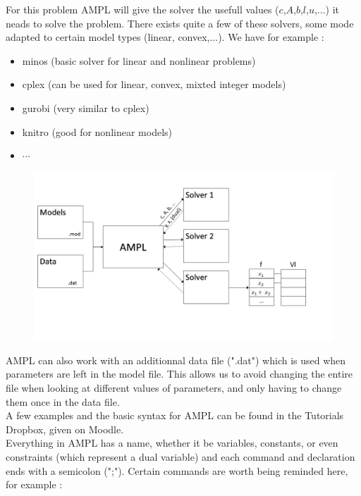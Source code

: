 \documentclass[a4paper,11pt]{article}
\begin{document}
For this problem AMPL will give the solver the usefull values ($c$,$A$,$b$,$l$,$u$,...) it neads to solve the problem. There exists quite a few of these solvers, some mode adapted to certain model types (linear, convex,...). 
We have for example :  \\

\begin{itemize}
  \item minos (basic solver for linear and nonlinear problems)
  \item cplex (can be used for linear, convex, mixted integer models)
  \item gurobi (very similar to cplex)
  \item knitro (good for nonlinear models)
  \item $\cdots$
\end{itemize} 

\begin{figure}[h!]
\centering
\includegraphics[scale=0.55]{Slide2.JPG}
\caption{}
\label{Figure2}
\end{figure} 

AMPL can also work with an additionnal data file (".dat") which is used when parameters are left in the model file. This allows us to avoid changing the entire file when looking at different values of parameters, and only having to change them once in the data file. \\

A few examples and the basic syntax for AMPL can be found in the Tutorials Dropbox, given on Moodle. \\

Everything in AMPL has a name, whether it be variables, constants, or even constraints (which represent a dual variable) and each command and declaration ends with a semicolon (";"). 
Certain commands are worth being reminded here, for example : \\
\end{document}
